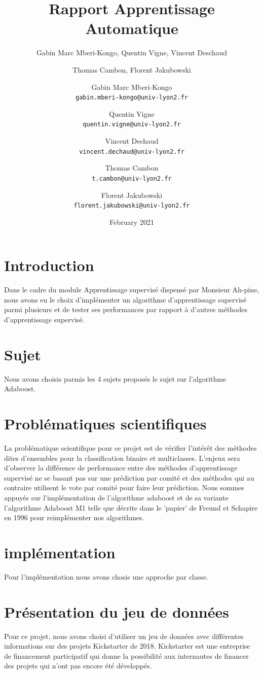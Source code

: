 \documentclass{article}
\title{Rapport Apprentissage Automatique}
\author{Gabin Marc Mberi-Kongo, Quentin Vigne, Vincent Deschaud}
\author{Thomas Cambon, Florent Jakubowski }
\author{
  Gabin Marc Mberi-Kongo\\
  \texttt{gabin.mberi-kongo@univ-lyon2.fr}
  \and
  Quentin Vigne\\
  \texttt{quentin.vigne@univ-lyon2.fr}
  \and
  Vincent Dechaud\\
  \texttt{vincent.dechaud@univ-lyon2.fr}
  \and
  Thomas Cambon\\
  \texttt{t.cambon@univ-lyon2.fr}
  \and
  Florent Jakubowski\\
  \texttt{florent.jakubowski@univ-lyon2.fr}
}
\date{February 2021}
\begin{document}
\maketitle

\tableofcontents

\section{Introduction}

Dans le cadre du module Apprentissage supervisé dispensé par Monsieur Ah-pine, nous avons eu le choix d'implémenter un algorithme d'apprentissage supervisé parmi plusieurs et de tester ses performances par rapport à d'autres méthodes d'apprentissage supervisé. 

\section{Sujet}
Nous avons choisis parmis les 4 sujets proposés le sujet sur l'algorithme Adaboost.
\section{Problématiques scientifiques}
La problématique scientifique pour ce projet est de vérifier l'intérêt des méthodes dites d'ensembles pour la classification binaire et multiclasses. L'enjeux sera d'observer la différence de performance entre des méthodes d'apprentissage supervisé ne se basant pas sur une prédiction par comité et des méthodes qui au contraire utilisent le vote par comité pour faire leur prédiction.
Nous sommes appuyés sur l'implémentation de l'algorithme adaboost et de sa variante l'algorithme Adaboost M1 telle que décrite dans le 'papier' de Freund et Schapire \citep{FreundSchapire1996} en 1996 pour reimplémenter nos algorithmes.

\section{implémentation}
Pour l'implémentation nous avons chosis une approche par classe.

\section{Présentation du jeu de données}

Pour ce projet, nous avons choisi d'utiliser un jeu de données avec différentes informations sur des projets Kickstarter de 2018. Kickstarter est une entreprise de financement participatif qui donne la possibilité aux internautes de financer des projets qui n'ont pas encore été développés.\newline 
\end{document}
